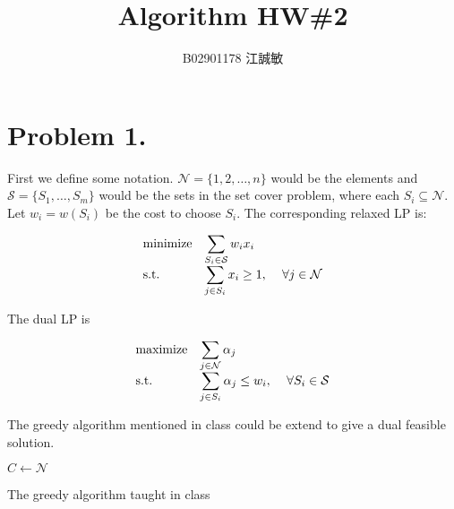 \documentclass[12pt, a4paper]{article}
\title{Algorithm HW\#2}
\author{B02901178 江誠敏}
\DeclarePairedDelimiter{\abs}{\lvert}{\rvert}
\begin{document}
\maketitle
\section{Problem 1.}

First we define some notation. $\mathcal{N} = \{1, 2, \dots, n\}$ would be the elements
and $\mathcal{S} = \{S_1, \dots, S_m\}$ would be the sets in the set cover problem,
where each $S_i \subseteq \mathcal{N}$. Let $w_i = w(S_i)$ be the cost to choose $S_i$.
The corresponding relaxed LP is:

\begin{equation} \label{eq:set-cover-lp}
  \begin{array}{>{\displaystyle}l>{\displaystyle}r>{\displaystyle}l}
    \text{minimize} & \multicolumn{1}{l}{\displaystyle \sum_{S_i \in \mathcal{S}} w_i x_i} \\[10pt]
    \text{s.t.} & \sum_{j \in S_i} x_i \geq 1, & \ \forall j \in \mathcal{N} \\
  \end{array}
\end{equation}

The dual LP is

\begin{equation} \label{eq:set-cover-dual-lp}
  \begin{array}{>{\displaystyle}l>{\displaystyle}r>{\displaystyle}l}
    \text{maximize} & \multicolumn{1}{l}{\displaystyle \sum_{j \in \mathcal{N}} \alpha_j} \\[10pt]
    \text{s.t.} & \sum_{j \in S_i} \alpha_j \leq w_i, & \ \forall S_i \in \mathcal{S} \\
  \end{array}
\end{equation}

The greedy algorithm mentioned in class could be extend to give a dual feasible solution.

\LinesNumbered
\begin{algorithm}[H]
  \DontPrintSemicolon
  $C \gets \mathcal{N}$ \quad {}
  \caption{The greedy algorithm taught in class}
\end{algorithm} \medskip
\end{document}

